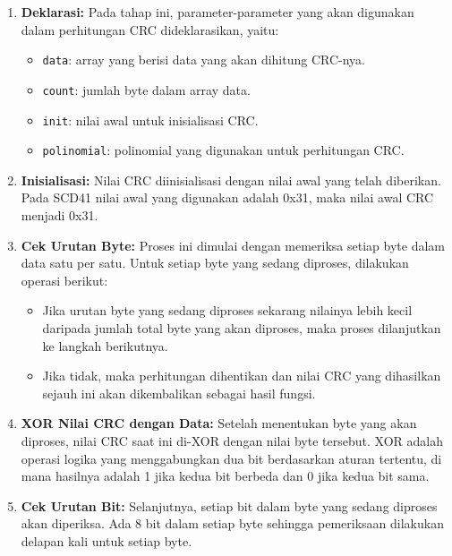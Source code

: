         \begin{enumerate}
            \item \textbf{Deklarasi:} 
            Pada tahap ini, parameter-parameter yang akan digunakan dalam perhitungan CRC dideklarasikan, yaitu:
            \begin{itemize}
                \item \texttt{data}: array yang berisi data yang akan dihitung CRC-nya.
                \item \texttt{count}: jumlah byte dalam array data.
                \item \texttt{init}: nilai awal untuk inisialisasi CRC.
                \item \texttt{polinomial}: polinomial yang digunakan untuk perhitungan CRC.
            \end{itemize}

            \item \textbf{Inisialisasi:} 
            Nilai CRC diinisialisasi dengan nilai awal yang telah diberikan. Pada SCD41 nilai awal yang digunakan adalah 0x31, maka nilai awal CRC menjadi 0x31.
        
            \item \textbf{Cek Urutan Byte:} 
            Proses ini dimulai dengan memeriksa setiap byte dalam data satu per satu. Untuk setiap byte yang sedang diproses, dilakukan operasi berikut:
            \begin{itemize}
                \item Jika urutan byte yang sedang diproses sekarang nilainya lebih kecil daripada jumlah total byte yang akan diproses, maka proses dilanjutkan ke langkah berikutnya.
                \item Jika tidak, maka perhitungan dihentikan dan nilai CRC yang dihasilkan sejauh ini akan dikembalikan sebagai hasil fungsi.
            \end{itemize}
        
            \item \textbf{XOR Nilai CRC dengan Data:} 
            Setelah menentukan byte yang akan diproses, nilai CRC saat ini di-XOR dengan nilai byte tersebut. XOR adalah operasi logika yang menggabungkan dua bit berdasarkan aturan tertentu, di mana hasilnya adalah 1 jika kedua bit berbeda dan 0 jika kedua bit sama.
        
            \item \textbf{Cek Urutan Bit:} 
            Selanjutnya, setiap bit dalam byte yang sedang diproses akan diperiksa. Ada 8 bit dalam setiap byte sehingga pemeriksaan dilakukan delapan kali untuk setiap byte.
        

\end{enumerate}
